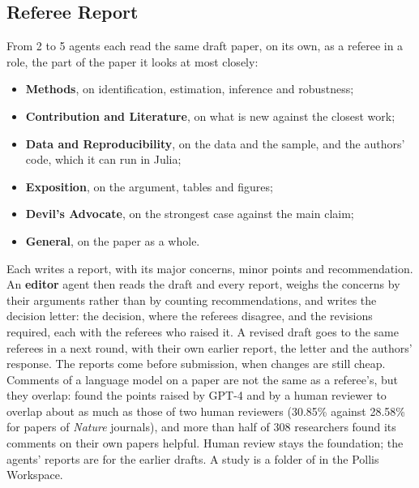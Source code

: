\subsection{Referee Report}
From 2 to 5 agents each read the same draft paper, on its own, as a referee in a role, the part of the paper it
looks at most closely:
\begin{itemize}
  \item \textbf{Methods}, on identification, estimation, inference and robustness;
  \item \textbf{Contribution and Literature}, on what is new against the closest work;
  \item \textbf{Data and Reproducibility}, on the data and the sample, and the authors' code, which it can run in Julia;
  \item \textbf{Exposition}, on the argument, tables and figures;
  \item \textbf{Devil's Advocate}, on the strongest case against the main claim;
  \item \textbf{General}, on the paper as a whole.
\end{itemize}
Each writes a report, with its major concerns, minor points and recommendation. An \textbf{editor} agent then reads
the draft and every report, weighs the concerns by their arguments rather than by counting recommendations, and
writes the decision letter: the decision, where the referees disagree, and the revisions required, each with the
referees who raised it. A revised draft goes to the same referees in a next round, with their own earlier report,
the letter and the authors' response. The reports come before submission, when changes are still cheap. Comments of a language model on a paper are not
the same as a referee's, but they overlap:  found the points
raised by GPT-4 and by a human reviewer to overlap about as much as those of two human reviewers (30.85\% against
28.58\% for papers of \emph{Nature} journals), and more than half of 308 researchers found its comments on their own
papers helpful. Human review stays the foundation; the agents' reports are for the earlier drafts. A study is a
folder of  in the Pollis Workspace.

